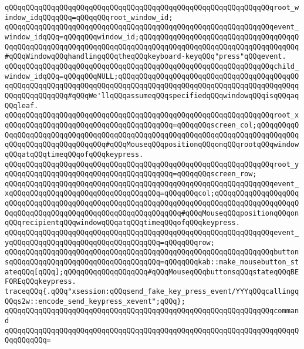 \verb|qQQqqQQqqQQqqQQqqQQqqQQqqQQqqQQqqQQqqQQqqQQqqQQqqQQqqQQqqQQqqQQqroot_window_idqQQqqQQq=qQQqqQQqroot_window_id;|\newline
\verb|qQQqqQQqqQQqqQQqqQQqqQQqqQQqqQQqqQQqqQQqqQQqqQQqqQQqqQQqqQQqqQQqevent_window_idqQQq=qQQqqQQqwindow_id;qQQqqQQqqQQqqQQqqQQqqQQqqQQqqQQqqQQqqQQqqQQqqQQqqQQqqQQqqQQqqQQqqQQqqQQqqQQqqQQqqQQqqQQqqQQqqQQqqQQqqQQqqQQq#qQQqWindowqQQqhandlingqQQqtheqQQqkeyboard-keyqQQq"press"qQQqevent.|\newline
\verb|qQQqqQQqqQQqqQQqqQQqqQQqqQQqqQQqqQQqqQQqqQQqqQQqqQQqqQQqqQQqqQQqchild_window_idqQQq=qQQqqQQqNULL;qQQqqQQqqQQqqQQqqQQqqQQqqQQqqQQqqQQqqQQqqQQqqQQqqQQqqQQqqQQqqQQqqQQqqQQqqQQqqQQqqQQqqQQqqQQqqQQqqQQqqQQqqQQqqQQqqQQqqQQqqQQqqQQq#qQQqWe'llqQQqassumeqQQqspecifiedqQQqwindowqQQqisqQQqaqQQqleaf.|\newline
\verb|qQQqqQQqqQQqqQQqqQQqqQQqqQQqqQQqqQQqqQQqqQQqqQQqqQQqqQQqqQQqqQQqroot_xqQQqqQQqqQQqqQQqqQQqqQQqqQQqqQQqqQQqqQQq=qQQqqQQqscreen_col;qQQqqQQqqQQqqQQqqQQqqQQqqQQqqQQqqQQqqQQqqQQqqQQqqQQqqQQqqQQqqQQqqQQqqQQqqQQqqQQqqQQqqQQqqQQqqQQqqQQqqQQq#qQQqMouseqQQqpositionqQQqonqQQqrootqQQqwindowqQQqatqQQqtimeqQQqofqQQqkeypress.|\newline
\verb|qQQqqQQqqQQqqQQqqQQqqQQqqQQqqQQqqQQqqQQqqQQqqQQqqQQqqQQqqQQqqQQqroot_yqQQqqQQqqQQqqQQqqQQqqQQqqQQqqQQqqQQqqQQq=qQQqqQQqscreen_row;|\newline
\verb|qQQqqQQqqQQqqQQqqQQqqQQqqQQqqQQqqQQqqQQqqQQqqQQqqQQqqQQqqQQqqQQqevent_xqQQqqQQqqQQqqQQqqQQqqQQqqQQqqQQqqQQq=qQQqqQQqcol;qQQqqQQqqQQqqQQqqQQqqQQqqQQqqQQqqQQqqQQqqQQqqQQqqQQqqQQqqQQqqQQqqQQqqQQqqQQqqQQqqQQqqQQqqQQqqQQqqQQqqQQqqQQqqQQqqQQqqQQqqQQqqQQqqQQq#qQQqMouseqQQqpositionqQQqonqQQqrecipientqQQqwindowqQQqatqQQqtimeqQQqofqQQqkeypress.|\newline
\verb|qQQqqQQqqQQqqQQqqQQqqQQqqQQqqQQqqQQqqQQqqQQqqQQqqQQqqQQqqQQqqQQqevent_yqQQqqQQqqQQqqQQqqQQqqQQqqQQqqQQqqQQq=qQQqqQQqrow;|\newline
\verb|qQQqqQQqqQQqqQQqqQQqqQQqqQQqqQQqqQQqqQQqqQQqqQQqqQQqqQQqqQQqqQQqbuttonsqQQqqQQqqQQqqQQqqQQqqQQqqQQqqQQqqQQq=qQQqqQQqkab::make_mousebutton_stateqQQq[qQQq];qQQqqQQqqQQqqQQqqQQq#qQQqMouseqQQqbuttonsqQQqstateqQQqBEFOREqQQqkeypress.|\newline
\newline
\verb|traceqQQq{.qQQq"xsession:qQQqsend_fake_key_press_event/YYYqQQqcallingqQQqs2w::encode_send_keypress_xevent";qQQq};|\newline
\verb|qQQqqQQqqQQqqQQqqQQqqQQqqQQqqQQqqQQqqQQqqQQqqQQqqQQqqQQqqQQqqQQqcommand|\newline
\verb|qQQqqQQqqQQqqQQqqQQqqQQqqQQqqQQqqQQqqQQqqQQqqQQqqQQqqQQqqQQqqQQqqQQqqQQqqQQqqQQq=|\newline
